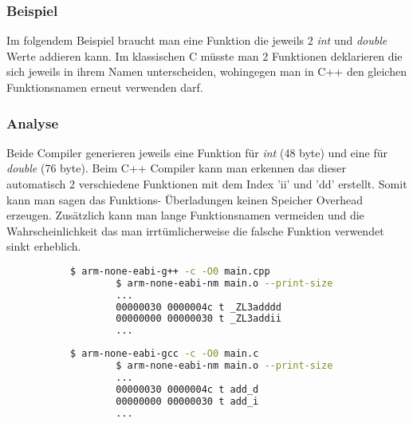 \documentclass[MES,Master,ngerman]{twbook}%
\begin{document}
\subsubsection{Beispiel} \label{beispiel:1}
Im folgendem Beispiel braucht man eine Funktion die jeweils 2 \textit{int} und \textit{double} Werte addieren kann. Im klassischen C müsste man 2 Funktionen deklarieren die sich jeweils in ihrem Namen unterscheiden, wohingegen man in C++ den gleichen Funktionsnamen erneut verwenden darf.
\begin{figure}[!htb]
	\begin{subfigure}[b]{0.5\textwidth}
		
		\label{fig:1}
	\end{subfigure}
	\begin{subfigure}[b]{0.5\textwidth}
		
		\label{fig:2}
	\end{subfigure}
\end{figure}

\subsubsection{Analyse}
Beide Compiler generieren jeweils eine Funktion für \textit{int} (48 byte) und eine für \textit{double} (76 byte). Beim C++ Compiler kann man erkennen das dieser automatisch 2 verschiedene Funktionen mit dem Index 'ii' und 'dd' erstellt. Somit kann man sagen das Funktions- Überladungen keinen Speicher Overhead erzeugen. Zusätzlich kann man lange Funktionsnamen vermeiden und die Wahrscheinlichkeit das man irrtümlicherweise die falsche Funktion verwendet sinkt erheblich.
\begin{figure}[!htb]
	\begin{subfigure}[b]{0.5\textwidth}
		\begin{lstlisting}[gobble=6, title={Analyse C++}, language=bash, numbers=none]
		$ arm-none-eabi-g++ -c -O0 main.cpp
		$ arm-none-eabi-nm main.o --print-size
		...
		00000030 0000004c t _ZL3adddd
		00000000 00000030 t _ZL3addii
		...
		\end{lstlisting}
	\end{subfigure}
	\begin{subfigure}[b]{0.5\textwidth}
		\begin{lstlisting}[gobble=6, title={Analyse C}, language=bash, numbers=none]
		$ arm-none-eabi-gcc -c -O0 main.c
		$ arm-none-eabi-nm main.o --print-size
		...
		00000030 0000004c t add_d
		00000000 00000030 t add_i
		...
		\end{lstlisting}
	\end{subfigure}
\end{figure}
\end{document}
